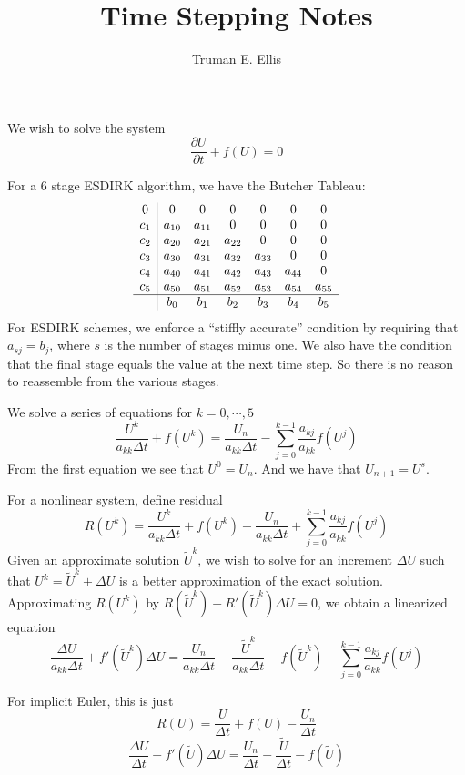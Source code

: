 \documentclass{article}
\author{Truman E. Ellis}
\title{Time Stepping Notes}
\begin{document}
\maketitle

We wish to solve the system
\[
\frac{\partial U}{\partial t}+f(U)=0
\]

For a 6 stage ESDIRK algorithm, we have the Butcher Tableau:
\[
\begin{array}{c|cccccc}
  0 & 0 & 0 & 0 & 0 & 0 & 0 \\
  c_1 & a_{10} & a_{11} & 0 & 0 & 0 & 0 \\
  c_2 & a_{20} & a_{21} & a_{22} & 0 & 0 & 0 \\
  c_3 & a_{30} & a_{31} & a_{32} & a_{33} & 0 & 0 \\
  c_4 & a_{40} & a_{41} & a_{42} & a_{43} & a_{44} & 0 \\
  c_5 & a_{50} & a_{51} & a_{52} & a_{53} & a_{54} & a_{55} \\
  \hline
   & b_0 & b_1 & b_2 & b_3 & b_4 & b_5 \\
\end{array}
\]
For ESDIRK schemes, we enforce a ``stiffly accurate'' condition by requiring
that $a_{sj} = b_j$, where $s$ is the number of stages minus one. We also have
the condition that the final stage equals the value at the next time step. So
there is no reason to reassemble from the various stages.

We solve a series of equations for $k=0,\cdots,5$
\[
\frac{U^k}{a_{kk}\Delta t}+f(U^k)=\frac{U_n}{a_{kk}\Delta
t}-\sum_{j=0}^{k-1}\frac{a_{kj}}{a_{kk}}f(U^j)
\]
From the first equation we see that $U^0=U_n$. And we have that $U_{n+1}=U^s$.

For a nonlinear system, define residual
\[
R(U^k) =
\frac{U^k}{a_{kk}\Delta t}+f(U^k)-\frac{U_n}{a_{kk}\Delta
t}+\sum_{j=0}^{k-1}\frac{a_{kj}}{a_{kk}}f(U^j)
\]
Given an approximate solution $\tilde U^k$, we wish to solve for an increment
$\Delta U$ such that $U^k=\tilde U^k + \Delta U$ is a better approximation of
the exact solution. Approximating $R(U^k)$ by $R(\tilde U^k)+R'(\tilde
U^k)\Delta U=0$, we obtain a linearized equation
\[
\frac{\Delta U}{a_{kk}\Delta t}+f'(\tilde U^k)\Delta U
=\frac{U_n}{a_{kk}\Delta t}-\frac{\tilde U^k}{a_{kk}\Delta t}-f(\tilde U^k)
-\sum_{j=0}^{k-1}\frac{a_{kj}}{a_{kk}}f(U^j)
\]

For implicit Euler, this is just
\[
R(U)=\frac{U}{\Delta t}+f(U)-\frac{U_n}{\Delta t}
\]
\[
\frac{\Delta U}{\Delta t}+f'(\tilde U)\Delta U
=\frac{U_n}{\Delta t}-\frac{\tilde U}{\Delta t}
-f(\tilde U)
\]
\end{document}

